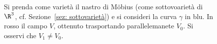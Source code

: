 \begin{figure}[ht]
	
	\caption{Si prenda come varietà il nastro di M\"obius (come sottovoarietà di \(\R^3\), cf. Sezione~\ref{sez: sottovarietà}) e si consideri la curva \(\gamma\) in blu. In rosso il campo \(V\), ottenuto trasportando parallelemanete \(V_0\). Si osservi che \(V_1 \neq V_0\). }
	
	\label{fig: trasporto parallelo mobius}
\end{figure}
